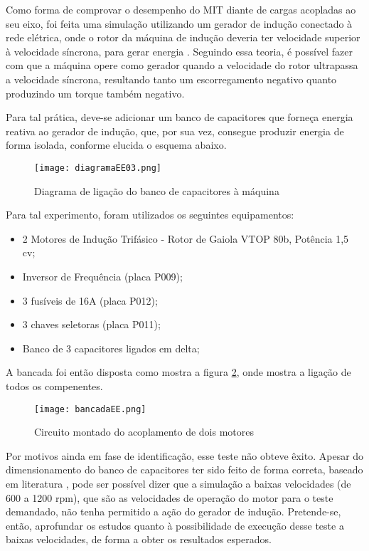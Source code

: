 			Como forma de comprovar o desempenho do MIT diante de cargas acopladas ao seu eixo, foi feita uma simulação utilizando um gerador de indução conectado à rede elétrica, onde o rotor da máquina de indução deveria ter velocidade superior à velocidade síncrona, para gerar energia \cite{Nascimento}. Seguindo essa teoria, é possível fazer com que a máquina opere como gerador quando a velocidade do rotor ultrapassa a velocidade síncrona, resultando tanto um escorregamento negativo quanto produzindo um torque também negativo.
			
			Para tal prática, deve-se adicionar um banco de capacitores que forneça energia reativa ao gerador de indução, que, por sua vez, consegue produzir energia de forma isolada, conforme elucida o esquema abaixo.

			\begin{figure}[!h]
				\centering
				\texttt{[image: diagramaEE03.png]}
				\caption[Diagrama de ligação do banco de capacitores à máquina]{Diagrama de ligação do banco de capacitores à máquina \cite{Nascimento}} 
				\label{diagramaEE03}
			\end{figure}

			Para tal experimento, foram utilizados os seguintes equipamentos:

			\begin{itemize}
				\item 2 Motores de Indução Trifásico - Rotor de Gaiola VTOP 80b, Potência 1,5 cv;
				\item Inversor de Frequência (placa P009);
				\item 3 fusíveis de 16A (placa P012);
				\item 3 chaves seletoras (placa P011);
				\item Banco de 3 capacitores ligados em delta;
			\end{itemize}

			A bancada foi então disposta como mostra a figura \ref{bancadaEE}, onde mostra a ligação de todos os compenentes.

			\begin{figure}[!htpb]
				\centering
				\texttt{[image: bancadaEE.png]}
				\caption[Circuito montado do acoplamento de dois motores]{Circuito montado do acoplamento de dois motores} 
				\label{bancadaEE}
			\end{figure}

			\newpage
			Por motivos ainda em fase de identificação, esse teste não obteve êxito. Apesar do dimensionamento do banco de capacitores ter sido feito de forma correta, baseado em literatura \cite{Vanco}, pode ser possível dizer que a simulação a baixas velocidades (de 600 a 1200 rpm), que são as velocidades de operação do motor para o teste demandado, não tenha permitido a ação do gerador de indução. Pretende-se, então, aprofundar os estudos quanto à possibilidade de execução desse teste a baixas velocidades, de forma a obter os resultados esperados.

